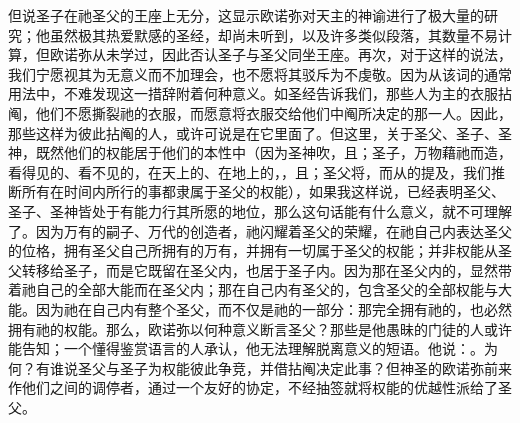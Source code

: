 但说圣子在祂圣父的王座上无分，这显示欧诺弥对天主的神谕进行了极大量的研究；他虽然极其热爱默感的圣经，却尚未听到，以及许多类似段落，其数量不易计算，但欧诺弥从未学过，因此否认圣子与圣父同坐王座。再次，对于这样的说法，我们宁愿视其为无意义而不加理会，也不愿将其驳斥为不虔敬。因为从该词的通常用法中，不难发现这一措辞附着何种意义。如圣经告诉我们，那些人为主的衣服拈阄，他们不愿撕裂祂的衣服，而愿意将衣服交给他们中阄所决定的那一人。因此，那些这样为彼此拈阄的人，或许可说是在它里面了。但这里，关于圣父、圣子、圣神，既然他们的权能居于他们的本性中（因为圣神吹，且；圣子，万物藉祂而造，看得见的、看不见的，在天上的、在地上的，，且；圣父将，而从的提及，我们推断所有在时间内所行的事都隶属于圣父的权能），如果我这样说，已经表明圣父、圣子、圣神皆处于有能力行其所愿的地位，那么这句话能有什么意义，就不可理解了。因为万有的嗣子、万代的创造者，祂闪耀着圣父的荣耀，在祂自己内表达圣父的位格，拥有圣父自己所拥有的万有，并拥有一切属于圣父的权能；并非权能从圣父转移给圣子，而是它既留在圣父内，也居于圣子内。因为那在圣父内的，显然带着祂自己的全部大能而在圣父内；那在自己内有圣父的，包含圣父的全部权能与大能。因为祂在自己内有整个圣父，而不仅是祂的一部分：那完全拥有祂的，也必然拥有祂的权能。那么，欧诺弥以何种意义断言圣父？那些是他愚昧的门徒的人或许能告知；一个懂得鉴赏语言的人承认，他无法理解脱离意义的短语。他说：。为何？有谁说圣父与圣子为权能彼此争竞，并借拈阄决定此事？但神圣的欧诺弥前来作他们之间的调停者，通过一个友好的协定，不经抽签就将权能的优越性派给了圣父。\par

